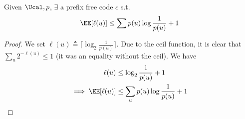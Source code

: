 \begin{theorem}
Given $\Ucal, p$, $\exists$ a prefix free code $c$ s.t.
\[\EE[\ell(u)] \leq \sum p(u) \log \frac{1}{p(u)} + 1\]
\end{theorem}
\begin{proof}
We set $\ell(u) \triangleq \lceil \log_2 \frac{1}{p(u)} \rceil$. Due to the ceil function, it is clear that $\sum_u 2^{-\ell(u)} \leq 1$ (it was an equality without the ceil). 
We have
\begin{align*}
    \ell(u) &\leq \log_2 \frac{1}{p(u)} + 1 \\
    \implies \EE[\ell(u)] &\leq \sum_u p(u) \log\frac{1}{p(u)} + 1
\end{align*}
\end{proof}